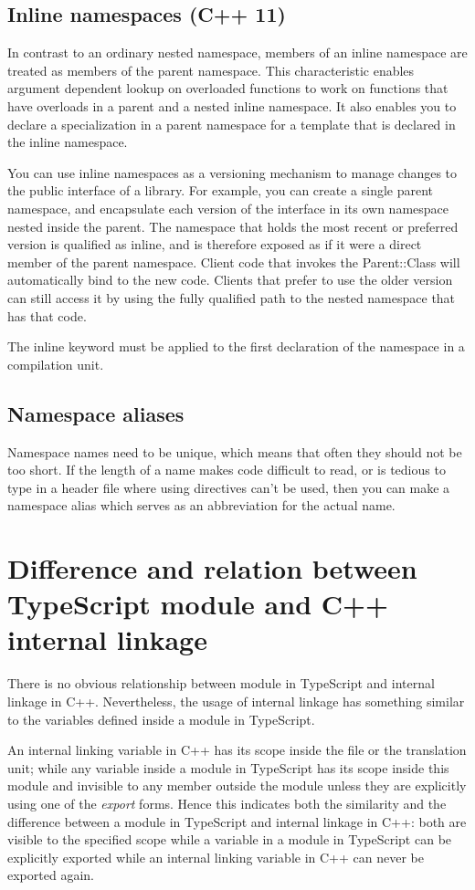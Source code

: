 \documentclass[a4paper]{report}
\begin{document}
\subsection{Inline namespaces (C++ 11)}
In contrast to an ordinary nested namespace, members of an inline namespace are treated as members of the parent namespace. This characteristic enables argument dependent lookup on overloaded functions to work on functions that have overloads in a parent and a nested inline namespace. It also enables you to declare a specialization in a parent namespace for a template that is declared in the inline namespace.
\par
You can use inline namespaces as a versioning mechanism to manage changes to the public interface of a library. For example, you can create a single parent namespace, and encapsulate each version of the interface in its own namespace nested inside the parent. The namespace that holds the most recent or preferred version is qualified as inline, and is therefore exposed as if it were a direct member of the parent namespace. Client code that invokes the Parent::Class will automatically bind to the new code. Clients that prefer to use the older version can still access it by using the fully qualified path to the nested namespace that has that code.
\par
The inline keyword must be applied to the first declaration of the namespace in a compilation unit.
\subsection{Namespace aliases}
Namespace names need to be unique, which means that often they should not be too short. If the length of a name makes code difficult to read, or is tedious to type in a header file where using directives can’t be used, then you can make a namespace alias which serves as an abbreviation for the actual name.
\section{Difference and relation between TypeScript module and C++ internal linkage}
There is no obvious relationship between module in TypeScript and internal linkage in C++. Nevertheless, the usage of internal linkage has something similar to the variables defined inside a module in TypeScript. 
\par
An internal linking variable in C++ has its scope inside the file or the translation unit; while any variable inside a module in TypeScript has its scope inside this module and invisible to any member outside the module unless they are explicitly using one of the \emph{export} forms. Hence this indicates both the similarity and the difference between a module in TypeScript and internal linkage in C++: both are visible to the specified scope while a variable in a module in TypeScript can be explicitly exported while an internal linking variable in C++ can never be exported again.
\end{document}
